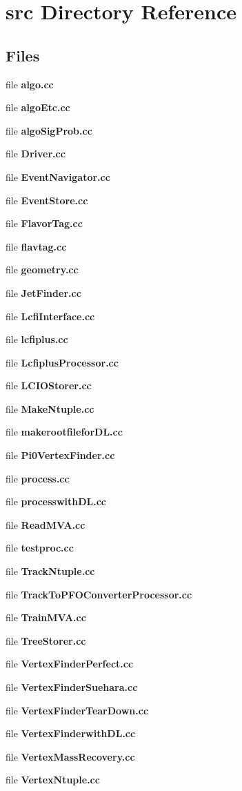 \section{src Directory Reference}
\label{dir_68267d1309a1af8e8297ef4c3efbcdba}
\subsection*{Files}
\begin{DoxyCompactItemize}
\item 
file \textbf{ algo.\+cc}
\item 
file \textbf{ algo\+Etc.\+cc}
\item 
file \textbf{ algo\+Sig\+Prob.\+cc}
\item 
file \textbf{ Driver.\+cc}
\item 
file \textbf{ Event\+Navigator.\+cc}
\item 
file \textbf{ Event\+Store.\+cc}
\item 
file \textbf{ Flavor\+Tag.\+cc}
\item 
file \textbf{ flavtag.\+cc}
\item 
file \textbf{ geometry.\+cc}
\item 
file \textbf{ Jet\+Finder.\+cc}
\item 
file \textbf{ Lcfi\+Interface.\+cc}
\item 
file \textbf{ lcfiplus.\+cc}
\item 
file \textbf{ Lcfiplus\+Processor.\+cc}
\item 
file \textbf{ L\+C\+I\+O\+Storer.\+cc}
\item 
file \textbf{ Make\+Ntuple.\+cc}
\item 
file \textbf{ makerootfilefor\+D\+L.\+cc}
\item 
file \textbf{ Pi0\+Vertex\+Finder.\+cc}
\item 
file \textbf{ process.\+cc}
\item 
file \textbf{ processwith\+D\+L.\+cc}
\item 
file \textbf{ Read\+M\+V\+A.\+cc}
\item 
file \textbf{ testproc.\+cc}
\item 
file \textbf{ Track\+Ntuple.\+cc}
\item 
file \textbf{ Track\+To\+P\+F\+O\+Converter\+Processor.\+cc}
\item 
file \textbf{ Train\+M\+V\+A.\+cc}
\item 
file \textbf{ Tree\+Storer.\+cc}
\item 
file \textbf{ Vertex\+Finder\+Perfect.\+cc}
\item 
file \textbf{ Vertex\+Finder\+Suehara.\+cc}
\item 
file \textbf{ Vertex\+Finder\+Tear\+Down.\+cc}
\item 
file \textbf{ Vertex\+Finderwith\+D\+L.\+cc}
\item 
file \textbf{ Vertex\+Mass\+Recovery.\+cc}
\item 
file \textbf{ Vertex\+Ntuple.\+cc}
\end{DoxyCompactItemize}
